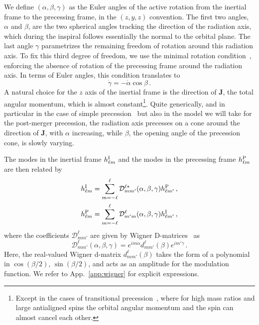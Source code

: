 \documentclass[aps,showpacs,twocolumn,
prd,superscriptaddress,nofootinbib]{revtex4-1}
\newcommand{\be}{\begin{equation}}
\newcommand{\ee}{\end{equation}}
\newcommand\calD{{\mathcal{D}}}
\newcommand{\jgb}[1]{{\color{DarkGreen} #1}}
\begin{document}
We define $(\alpha, \beta, \gamma)$ as the Euler angles of the active rotation from the inertial frame to the precessing frame, in the $(z,y,z)$ convention. The first two angles, $\alpha$ and $\beta$, are the two spherical angles tracking the direction of the radiation axis, which during the inspiral follows essentially the normal to the orbital plane. The last angle $\gamma$ parametrizes the remaining freedom of rotation around this radiation axis. To fix this third degree of freedom, we use the minimal rotation condition~\cite{Boyle+11}, enforcing the absence of rotation of the precessing frame around the radiation axis. In terms of Euler angles, this condition translates to
\be\label{eq:gammadot}
	\dot{\gamma} = -\dot{\alpha}\cos \beta \,.
\ee
A natural choice for the $z$ axis of the inertial frame is the direction of $\bm{J}$, the total angular momentum, which is almost constant\footnote{Except in the cases of transitional precession~\cite{Apostolatos+94}, where for high mass ratios and large antialigned spins the orbital angular momentum and the spin can almost cancel each other.}. Quite generically, and in particular in the case of simple precession~\cite{Apostolatos+94, Kidder95} but also in the model we will take for the post-merger precession, the radiation axis precesses on a cone around the direction of $\bm{J}$, with $\alpha$ increasing, while $\beta$, the opening angle of the precession cone, is slowly varying.

The modes in the inertial frame $h_{\ell m}^{\rm I}$ and the modes in the precessing frame $h_{\ell m}^{\rm P}$ are then related by~\cite{Goldberg+67}
\begin{subequations}
\label{eq:wignerrot}
\begin{align}
	h_{\ell m}^{\rm I} = \sum\limits_{m=-\ell}^{\ell} \calD^{\ell *}_{mm'} (\alpha,\beta,\gamma) h_{\ell m'}^{\rm P} \,, \\
	h_{\ell m}^{\rm P} = \sum\limits_{m=-\ell}^{\ell} \calD^{\ell }_{m'm} (\alpha,\beta,\gamma) h_{\ell m'}^{\rm I} \,,
\end{align}
\end{subequations}
where the coefficients $\calD^{\ell}_{mm'}$ are given by Wigner D-matrices~\cite{Wigner59} as
\be\label{eq:defWignerD}
	\calD^{\ell}_{mm'} (\alpha, \beta, \gamma) = e^{im \alpha} d^{\ell}_{mm'}(\beta) e^{im' \gamma}\,.
\ee
Here, the \jgb{real-valued} Wigner d-matrix $d^{\ell}_{mm'}(\beta)$ takes the form of a polynomial in $\cos (\beta/2)$, $\sin (\beta/2)$, and acts as an amplitude for the modulation function. We refer to App.~\ref{app:wigner} for explicit expressions.
\end{document}
